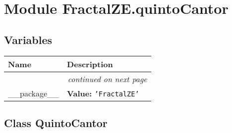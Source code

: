 %
%
%


\section{Module FractalZE.quintoCantor}

    \label{FractalZE:quintoCantor}


  \subsection{Variables}

    \vspace{-1cm}
\hspace{\varindent}\begin{longtable}{|p{\varnamewidth}|p{\vardescrwidth}|l}
\cline{1-2}
\cline{1-2} \centering \textbf{Name} & \centering \textbf{Description}& \\
\cline{1-2}
\endhead\cline{1-2}\multicolumn{3}{r}{\small\textit{continued on next page}}\\\endfoot\cline{1-2}
\endlastfoot\raggedright \_\-\_\-p\-a\-c\-k\-a\-g\-e\-\_\-\_\- & \raggedright \textbf{Value:} 
{\tt \texttt{'}\texttt{FractalZE}\texttt{'}}&\\
\cline{1-2}
\end{longtable}



\subsection{Class QuintoCantor}

